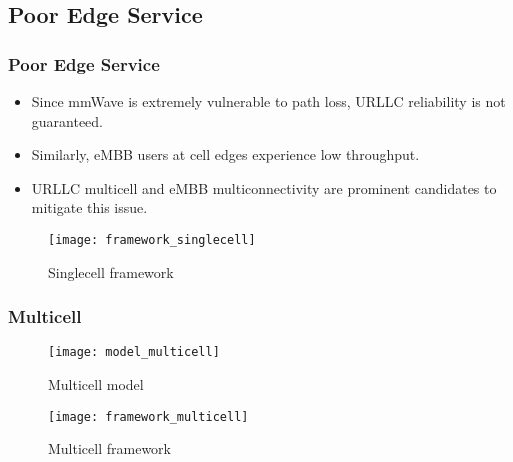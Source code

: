 \subsection{Poor Edge Service}
\begin{frame}
  \frametitle{Poor Edge Service}
  \begin{itemize}
    \item Since mmWave is extremely vulnerable to path loss, URLLC reliability is not guaranteed.
    \item Similarly, eMBB users at cell edges experience low throughput.
  \end{itemize}
\end{frame}

\begin{frame}
  \begin{itemize}
    \item URLLC multicell and eMBB multiconnectivity are prominent candidates to mitigate this issue.
  \end{itemize}
\end{frame}

\begin{frame}
  \begin{figure}
    \texttt{[image: framework\_singlecell]}
    \caption{Singlecell framework}
  \end{figure}
\end{frame}

\begin{frame}
  \frametitle{Multicell}
  \begin{figure}
    \texttt{[image: model\_multicell]}
    \caption{Multicell model}
  \end{figure}
\end{frame}

\begin{frame}
  \begin{figure}
    \texttt{[image: framework\_multicell]}
    \caption{Multicell framework}
  \end{figure}
\end{frame}

